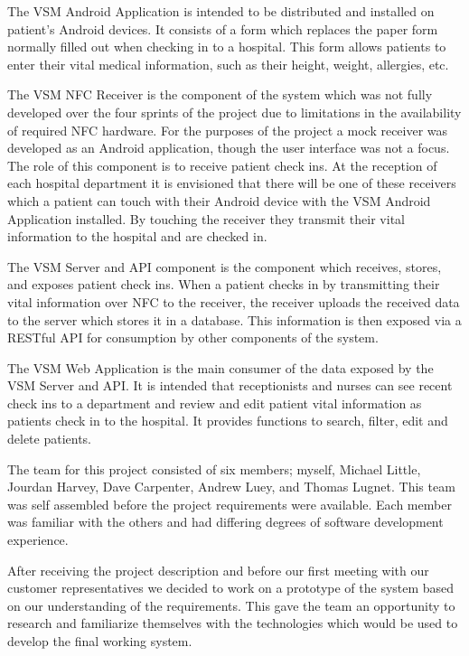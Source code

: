 \documentclass[conference]{IEEEtran}
\begin{document}
The VSM Android Application is intended to be distributed and installed on
patient's Android devices. It consists of a form which replaces the paper form
normally filled out when checking in to a hospital. This form allows patients to
enter their vital medical information, such as their height, weight, allergies,
etc.

The VSM NFC Receiver is the component of the system which was not fully
developed over the four sprints of the project due to limitations in the
availability of required NFC hardware. For the purposes of the project a mock
receiver was developed as an Android application, though the user interface was
not a focus. The role of this component is to receive patient check ins. At the
reception of each hospital department it is envisioned that there will be one of
these receivers which a patient can touch with their Android device with the VSM
Android Application installed. By touching the receiver they transmit their
vital information to the hospital and are checked in.

The VSM Server and API component is the component which receives, stores, and
exposes patient check ins. When a patient checks in by transmitting their vital
information over NFC to the receiver, the receiver uploads the received data to
the server which stores it in a database. This information is then exposed via a
RESTful API for consumption by other components of the system.

The VSM Web Application is the main consumer of the data exposed by the VSM
Server and API. It is intended that receptionists and nurses can see recent
check ins to a department and review and edit patient vital information as
patients check in to the hospital. It provides functions to search, filter, edit
and delete patients.

The team for this project consisted of six members; myself, Michael Little,
Jourdan Harvey, Dave Carpenter, Andrew Luey, and Thomas Lugnet. This team was
self assembled before the project requirements were available. Each member was
familiar with the others and had differing degrees of software development
experience.

After receiving the project description and before our first meeting with our
customer representatives we decided to work on a prototype of the system based
on our understanding of the requirements. This gave the team an opportunity to
research and familiarize themselves with the technologies which would be used to
develop the final working system.
\end{document}
